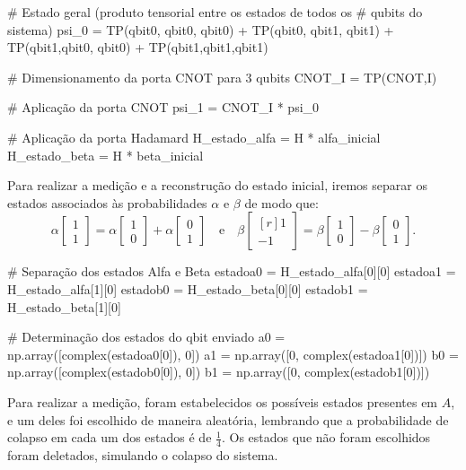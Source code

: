 \begin{pycode}
    # Estado geral (produto tensorial entre os estados de todos os
    # qubits do sistema)
    psi_0 = TP(qbit0, qbit0, qbit0) + TP(qbit0, qbit1, qbit1) +
            TP(qbit1,qbit0, qbit0) + TP(qbit1,qbit1,qbit1)

    # Dimensionamento da porta CNOT para 3 qubits
    CNOT_I = TP(CNOT,I)

    # Aplicação da porta CNOT
    psi_1 = CNOT_I * psi_0

    # Aplicação da porta Hadamard
    H_estado_alfa = H * alfa_inicial
    H_estado_beta = H * beta_inicial
\end{pycode}

Para realizar a medição e a reconstrução do estado inicial, iremos separar os estados associados às probabilidades \(\alpha\) e \(\beta\) de modo que:
\[
  \alpha \begin{bmatrix} 1 \\ 1 \end{bmatrix} = \alpha \begin{bmatrix} 1 \\ 0 \end{bmatrix} + \alpha \begin{bmatrix} 0 \\ 1 \end{bmatrix}
  \quad \text{e} \quad
  \beta \begin{bmatrix*}[r] 1 \\ -1 \end{bmatrix*} = \beta \begin{bmatrix} 1 \\ 0 \end{bmatrix} - \beta \begin{bmatrix} 0 \\ 1 \end{bmatrix}.
\]

\begin{pycode}
    # Separação dos estados Alfa e Beta
		estadoa0 = H_estado_alfa[0][0]
		estadoa1 = H_estado_alfa[1][0]
		estadob0 = H_estado_beta[0][0]
		estadob1 = H_estado_beta[1][0]

	# Determinação dos estados do qbit enviado
		a0 = np.array([complex(estadoa0[0]), 0])
		a1 = np.array([0, complex(estadoa1[0])])
		b0 = np.array([complex(estadob0[0]), 0])
		b1 = np.array([0, complex(estadob1[0])])
\end{pycode}

Para realizar a medição, foram estabelecidos os possíveis estados presentes em \(A\), e um deles foi escolhido de maneira aleatória, lembrando que a probabilidade de colapso em cada um dos estados é de \(\frac{1}{4}\). Os estados que não foram escolhidos foram deletados, simulando o colapso do sistema.

